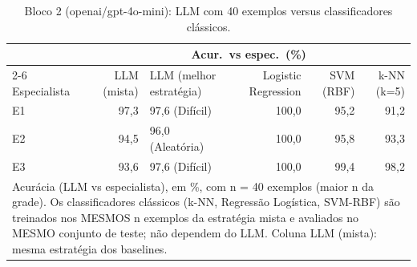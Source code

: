\begin{table}[htbp]
\centering
\small
\caption{Bloco 2 (openai/gpt-4o-mini): LLM com 40 exemplos versus classificadores clássicos.}
\label{tab:bloco2_E_LLM_vs_baselines_nmax_gpt4mini}
\begin{tabular}{lrlrrr}
\toprule
 & \multicolumn{5}{c}{Acur.\ vs espec.\ (\%)} \\ \cmidrule(lr){2-6}
Especialista & LLM (mista) & LLM (melhor estratégia) & Logistic Regression & SVM (RBF) & k-NN (k=5) \\
\midrule
E1 & 97,3 & 97,6 (Difícil) & 100,0 & 95,2 & 91,2 \\
E2 & 94,5 & 96,0 (Aleatória) & 100,0 & 95,8 & 93,3 \\
E3 & 93,6 & 97,6 (Difícil) & 100,0 & 99,4 & 98,2 \\
\bottomrule
\multicolumn{6}{p{0.95\linewidth}}{\footnotesize Acurácia (LLM vs especialista), em \%, com n = 40 exemplos (maior n da grade). Os classificadores clássicos (k-NN, Regressão Logística, SVM-RBF) são treinados nos MESMOS n exemplos da estratégia mista e avaliados no MESMO conjunto de teste; não dependem do LLM. Coluna LLM (mista): mesma estratégia dos baselines.} \\
\end{tabular}
\end{table}
